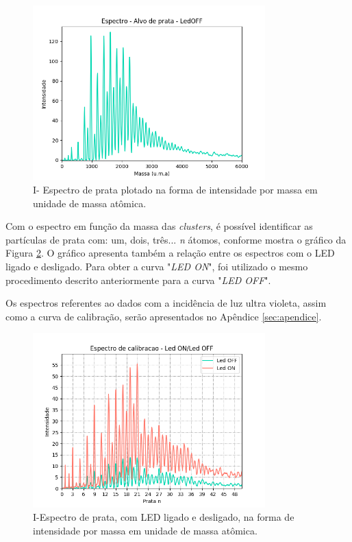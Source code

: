 \begin{figure}
  \centering  
  \includegraphics[width=0.8\textwidth]{graficos_resultados/0105_LEDOFF_espec_calib_ag_massa}
  \caption{I- Espectro de prata plotado na forma de intensidade por massa em unidade de massa atômica.}
  \label{fig:0105_LEDOFF_espec_calib_ag_massa} 
\end{figure}

Com o espectro em função da massa das \textit{clusters}, é possível identificar as partículas de prata com: um, dois, três... \textit{n} átomos, conforme mostra o gráfico da Figura \ref{fig:exp_01_LEDONOFF_N}. O gráfico apresenta também a relação entre os espectros com o LED ligado e desligado. Para obter a curva "\textit{LED ON}", foi utilizado o mesmo procedimento descrito anteriormente para a curva "\textit{LED OFF}".

Os espectros referentes ao dados com a incidência de luz ultra violeta, assim como a curva de calibração, serão apresentados no Apêndice \ref{sec:apendice}.


\begin{figure}
  \centering  
  \includegraphics[width=0.8\textwidth]{exp_01/Led_ON_Led_OFF_espectro_calib_prata_N_}
  \caption{I-Espectro de prata, com LED ligado e desligado, na forma de intensidade por massa em unidade de massa atômica.}
  \label{fig:exp_01_LEDONOFF_N}
\end{figure}

